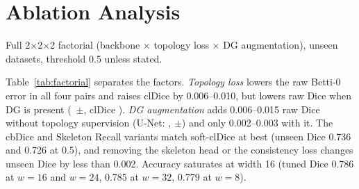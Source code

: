 \documentclass[conference]{IEEEtran}
\begin{document}
\section{Ablation Analysis}
\begin{table}[t]
\centering
\caption{Full 2$\times$2$\times$2 factorial (backbone $\times$ topology loss $\times$ DG augmentation), unseen datasets, threshold 0.5 unless stated.}
\label{tab:factorial}
\footnotesize
\setlength{\tabcolsep}{3pt}
\begin{adjustbox}{max width=\columnwidth}\end{adjustbox}
\end{table}
Table~\ref{tab:factorial} separates the factors. \emph{Topology loss} lowers the raw Betti-0 error in all four pairs and raises clDice by 0.006--0.010, but lowers raw Dice when DG is present (\dXCDice\ $\pm$\ciXCDice, clDice \dXCCl). \emph{DG augmentation} adds 0.006--0.015 raw Dice without topology supervision (U-Net: \dAXDice, $\pm$\ciAXDice) and only 0.002--0.003 with it. The cbDice and Skeleton Recall variants match soft-clDice at best (unseen Dice 0.736 and 0.726 at 0.5), and removing the skeleton head or the consistency loss changes unseen Dice by less than 0.002. Accuracy saturates at width 16 (tuned Dice 0.786 at $w{=}16$ and $w{=}24$, 0.785 at $w{=}32$, 0.779 at $w{=}8$).

\end{document}
